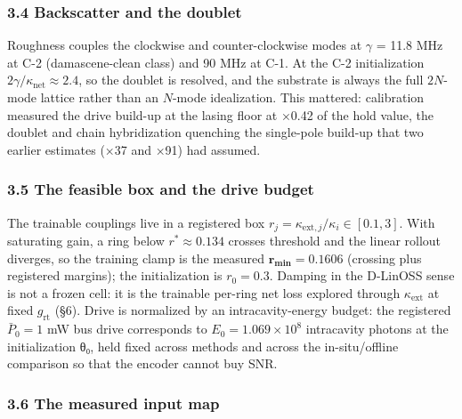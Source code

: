 \documentclass[
  10pt,
]{article}
\begin{document}
\subsubsection{3.4 Backscatter and the
doublet}\label{backscatter-and-the-doublet}

Roughness couples the clockwise and counter-clockwise modes at
\(\gamma\) = 11.8 MHz at C-2 (damascene-clean class) and 90 MHz at C-1.
At the C-2 initialization \(2\gamma/\kappa_\text{net}
\approx 2.4\), so the doublet is resolved, and the substrate is always
the full \(2N\)-mode lattice rather than an \(N\)-mode idealization.
This mattered: calibration measured the drive build-up at the lasing
floor at ×0.42 of the hold value, the doublet and chain hybridization
quenching the single-pole build-up that two earlier estimates (×37 and
×91) had assumed.

\subsubsection{3.5 The feasible box and the drive
budget}\label{the-feasible-box-and-the-drive-budget}

The trainable couplings live in a registered box
\(r_j = \kappa_{\text{ext},j}/\kappa_i \in
[0.1, 3]\). With saturating gain, a ring below \(r^* \approx 0.134\)
crosses threshold and the linear rollout diverges, so the training clamp
is the measured \(\mathbf{r_\text{min} = 0.1606}\) (crossing plus
registered margins); the initialization is \(r_0 = 0.3\). Damping in the
D-LinOSS sense is not a frozen cell: it is the trainable per-ring net
loss explored through \(\kappa_\text{ext}\) at fixed \(g_\text{rt}\)
(§6). Drive is normalized by an intracavity-energy budget: the
registered \(\bar P_0 = 1\) mW bus drive corresponds to
\(E_0 = 1.069\times10^8\) intracavity photons at the initialization θ₀,
held fixed across methods and across the in-situ/offline comparison so
that the encoder cannot buy SNR.

\subsubsection{3.6 The measured input map}\label{the-measured-input-map}
\end{document}

